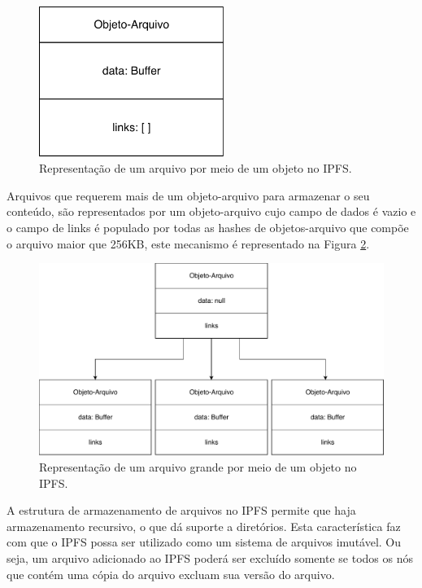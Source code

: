 \documentclass[tcc,capa]{texufpel}
\begin{document}
    \begin{figure}[h!]
        \centering
        \includegraphics[width=6cm]{imagens/arquivo-objeto-ipfs.pdf}
        \caption{Representação de um arquivo por meio de um objeto no IPFS.}
        \label{fig:arquivo-objeto-ipfs}
    \end{figure}
    
    Arquivos que requerem mais de um objeto-arquivo para armazenar o seu conteúdo, são representados por um objeto-arquivo cujo campo de dados é vazio e o campo de links é populado por todas as hashes de objetos-arquivo que compõe o arquivo maior que 256KB, este mecanismo é representado na Figura \ref{fig:representacao-arquivo-grande-ipfs}.
    
    \begin{figure}[h!]
        \centering
        \includegraphics[width=15cm]{imagens/representacao-arquivo-grande-ipfs.pdf}
        \caption{Representação de um arquivo grande por meio de um objeto no IPFS.}
        \label{fig:representacao-arquivo-grande-ipfs}
    \end{figure}
    
    A estrutura de armazenamento de arquivos no IPFS permite que haja armazenamento recursivo, o que dá suporte a diretórios. Esta característica faz com que o IPFS possa ser utilizado como um sistema de arquivos imutável. Ou seja, um arquivo adicionado ao IPFS poderá ser excluído somente se todos os nós que contém uma cópia do arquivo excluam sua versão do arquivo.
    
\end{document}
